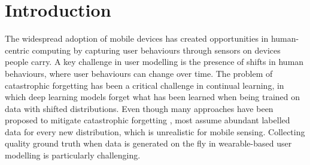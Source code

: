 \section{Introduction}


The widespread adoption of mobile devices has created opportunities in human-centric computing by capturing user behaviours through sensors on devices people carry. A key challenge in user modelling is the presence of shifts in human behaviours, where user behaviours can change over time. The problem of catastrophic forgetting \cite{kirkpatrick2017overcoming, aljundi2018memory, diethe2019continual, van2019three} has been a critical challenge in continual learning, in which deep learning models forget what has been learned when being trained on data with shifted distributions. Even though many approaches have been proposed to mitigate catastrophic forgetting \cite{kirkpatrick2017overcoming, li2017learning, shin2017continual, wu2019large}, most assume abundant labelled data for every new distribution, which is unrealistic for mobile sensing. Collecting quality ground truth when data is generated on the fly in wearable-based user modelling is particularly challenging.


